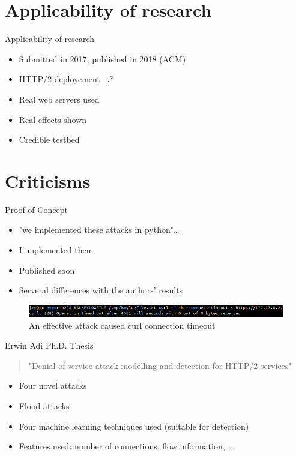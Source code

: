 \documentclass{beamer}
\begin{document}
\section{Applicability of research}
\begin{frame}{Applicability of research}
\begin{itemize}
	\item Submitted in 2017, published in 2018 (ACM)
	\item HTTP/2 deployement $\nearrow$
	\item Real web servers used
	\item Real effects shown
	\item Credible testbed
\end{itemize}
\end{frame}

\section{Criticisms}

\begin{frame}{Proof-of-Concept}
	\begin{itemize}
		\item "we implemented these attacks in python"\ldots
		\item I implemented them
		\item Published soon
		\item Serveral differences with the authors' results
	\end{itemize}
  \begin{figure}[t]
    \includegraphics[scale=0.38]{images/curlTimout.png}
    \caption{An effective attack caused curl connection timeout}
  \end{figure}
\end{frame}

\begin{frame}{Erwin Adi Ph.D. Thesis}
	\begin{quote}
"Denial-of-service attack modelling and detection for HTTP/2 services" ~\cite{Adi:2017}
	\end{quote}
\begin{itemize}
	\item Four novel attacks
	\item Flood attacks
	\item Four machine learning techniques used (suitable for detection)
	\item Features used: number of connections, flow information, \ldots
\end{itemize}
\end{frame}
\end{document}
